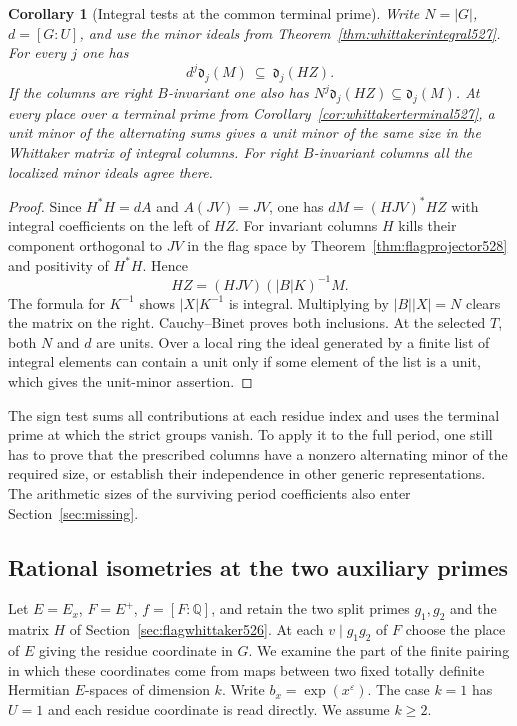 \documentclass[a4paper,11pt]{article}
\newtheorem{corollary}[proposition]{Corollary}
\theoremstyle{definition}
\theoremstyle{remark}
\numberwithin{equation}{section}
\begin{document}
\begin{corollary}[Integral tests at the common terminal prime]
\leavevmode\label{cor:apartmentideals528}
Write \(N=|G|\), \(d=[G:U]\), and use the minor ideals from
Theorem~\ref{thm:whittakerintegral527}. For every \(j\) one has
\[
             d^j\mathfrak d_j(M)\ \subseteq\ \mathfrak d_j(HZ).
\]
If the columns are right \(B\)-invariant one also has
\(N^j\mathfrak d_j(HZ)\subseteq\mathfrak d_j(M)\).
At every place over a terminal prime from
Corollary~\ref{cor:whittakerterminal527}, a unit minor of the
alternating sums gives a unit minor of the same size in the
Whittaker matrix of integral columns. For right \(B\)-invariant
columns all the localized minor ideals agree there.
\end{corollary}
\begin{proof}
Since \(H^*H=dA\) and \(A(JV)=JV\), one has
\(dM=(HJV)^*HZ\) with integral coefficients on the left of \(HZ\).
For invariant columns \(H\) kills their component orthogonal to
\(JV\) in the flag space by Theorem~\ref{thm:flagprojector528}
and positivity of \(H^*H\). Hence
\[
            HZ=(HJV)(|B|K)^{-1}M .
\]
The formula for \(K^{-1}\) shows \(|X|K^{-1}\) is integral.
Multiplying by \(|B||X|=N\) clears the matrix on the right.
Cauchy--Binet proves both inclusions. At the selected \(T\), both
\(N\) and \(d\) are units. Over a local ring the ideal generated by
a finite list of integral elements can contain a unit only if some
element of the list is a unit, which gives the unit-minor assertion.
\end{proof}

The sign test sums all contributions at each residue index and uses
the terminal prime at which the strict groups vanish. To apply it
to the full period, one still has to prove that the prescribed
columns have a nonzero alternating minor of the required size, or
establish their independence in other generic representations. The
arithmetic sizes of the surviving period coefficients also enter
Section~\ref{sec:missing}.


\subsection{Rational isometries at the two auxiliary primes}
\label{sec:isometryseparation530}

Let \(E=E_x\), \(F=E^+\), \(f=[F:\mathbb Q]\), and retain the two
split primes \(g_1,g_2\) and the matrix \(H\) of
Section~\ref{sec:flagwhittaker526}. At each \(v\mid g_1g_2\) of \(F\)
choose the place of \(E\) giving the residue coordinate in \(G\).
We examine the part of the finite pairing in which these coordinates
come from maps between two fixed totally definite Hermitian
\(E\)-spaces of dimension \(k\). Write \(b_x=\exp(x^\varepsilon)\).
The case \(k=1\) has \(U=1\) and each residue coordinate is read
directly. We assume \(k\ge2\).
\end{document}

